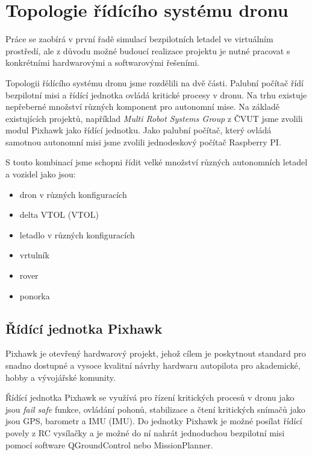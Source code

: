 \chapter{Topologie řídícího systému dronu}

Práce se zaobírá v první řadě simulací bezpilotních letadel ve virtuálním prostředí, ale z důvodu možné budoucí realizace projektu je nutné pracovat s konkrétními hardwarovými a softwarovými řešeními.

Topologii řídícího systému dronu jsme rozdělili na dvě části. Palubní počítač řídí bezpilotní misi a řídící jednotka ovládá kritické procesy v dronu. Na trhu existuje nepřeberné množství různých komponent pro autonomní mise. Na základě existujících projektů, například \textit{Multi Robot Systems Group} z ČVUT \cite{MRS} jsme zvolili modul Pixhawk jako řídící jednotku. Jako palubní počítač, který ovládá samotnou autonomní misi jsme zvolili jednodeskový počítač Raspberry PI.

S touto kombinací jsme schopni řídit velké množství různých autonomních letadel a vozidel jako jsou:

\begin{itemize}
    \item dron v různých konfiguracích
    \item delta \acs{VTOL} (\acl{VTOL})
    \item letadlo v různých konfiguracích
    \item vrtulník
    \item rover
    \item ponorka
\end{itemize}

\section{Řídící jednotka Pixhawk}

Pixhawk je otevřený hardwarový projekt, jehož cílem je poskytnout standard pro snadno dostupné a vysoce kvalitní návrhy hardwaru autopilota pro akademické, hobby a vývojářské komunity. \cite{PIX1}

Řídící jednotka Pixhawk se využívá pro řízení kritických procesů v dronu jako jsou \textit{fail safe} funkce, ovládání pohonů, stabilizace a čtení kritických snímačů jako jsou GPS, barometr a \acs{IMU} (\acl{IMU}). Do jednotky Pixhawk je možné posílat řídící povely z RC vysílačky a je možné do ní nahrát jednoduchou bezpilotní misi pomocí software QGroundControl nebo MissionPlanner.

